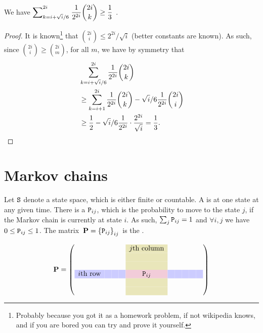 \begin{lemma}
    We have
    \begin{math}
        \displaystyle \smash{\sum\nolimits_{k=i + \sqrt{i}/6}^{2i}}\;
        \frac{1}{2^{2i}}\binom{2i}{k} \geq \frac{1}{3}
    \end{math}    .
\end{lemma}
\begin{proof}
    It is known\footnote{Probably because you got it as a homework
       problem, if not wikipedia knows, and if you are bored you can
       try and prove it yourself.} that
    $\binom{2i}{i}\leq 2^{2i}/\sqrt{i}$ (better constants are known).
    As such, since $\binom{2i}{i}\geq \binom{2i}{m}$, for all $m$, we
    have by symmetry that
    \begin{align*}
        &\ds \sum_{k=i + \sqrt{i}/6}^{2i} \frac{1}{2^{2i}}
           \binom{2i}{k}%
           \\&\geq%
           \sum_{k=i+1}^{2i} \frac{1}{2^{2i}}\binom{2i}{k} - \sqrt{i}/6
           \frac{1}{2^{2i}} \binom{2i}{i}%
           \\&\geq%
           \frac{1}{2} - \sqrt{i}/6 \frac{1}{2^{2i}} \cdot
           \frac{2^{2i}}{\sqrt{i}}%
           =%
           \frac{1}{3}.
    \end{align*}
\end{proof}



\section{Markov chains}

Let $\mathtt{S}$ denote a state space, which is either finite or
countable.  A  is at one state at any given time.
There is a  $\mathtt{P}_{ij}$, which is the
probability to move to the state $j$, if the Markov chain is currently
at state $i$. As such, $\sum_{j} \mathtt{P}_{ij} = 1$ and $\forall i,j$ we
have $0 \leq \mathtt{P}_{ij} \leq 1$. The matrix $\,\mathbf{P} = \left\{ {
   \mathtt{P}_{ij} } \right\}_{ij}\,$ is the .

\begin{equation*}
    \MCPrbM
    =%
    \left(
        \begin{array}{cccc>{\columncolor{olive!20}}ccccccc|}
          \multicolumn{1}{c}{}& & & 
          &
            {j \text{\th column}} & & &  \\
                              & & & & & & & & & \cr%
                                  & & & & & & & & & \\%
          \rowcolor{blue!20}
          i\text{\th row} & & & & \cellcolor{purple!20}\MCPrb_{ij} & & & & & \\%
                              & & & & & & & & & \\%
                              & & & & & & & & & \\%
        \end{array}
    \right)
  \end{equation*}


